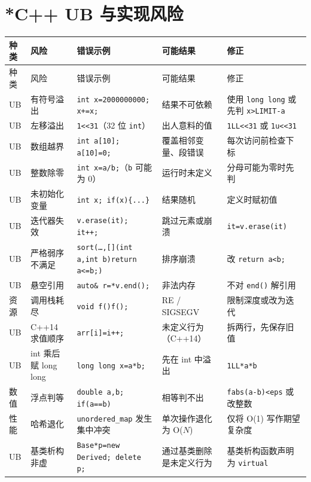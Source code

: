 \documentclass[a4paper,11pt]{article}
\newcommand{\code}[1]{\texttt{#1}}
\begin{document}
\newpage
\section{*C++ UB 与实现风险}

\begingroup
\small
\begin{longtable}{L{0.9cm} L{2cm} L{4.8cm} L{3.1cm} L{4.5cm}}
\toprule
种类 & 风险 & 错误示例 & 可能结果 & 修正 \\
\midrule
\endfirsthead
\toprule
种类 & 风险 & 错误示例 & 可能结果 & 修正 \\
\midrule
\endhead
\endfoot
\bottomrule
\endlastfoot

UB & 有符号溢出 & \code{int x=2000000000; x+=x;} & 结果不可依赖 & 使用 \code{long long} 或先判 \code{x>LIMIT-a} \\[2mm]
UB & 左移溢出 & \code{1<<31}（32 位 \code{int}） & 出人意料的值 & \code{1LL<<31} 或 \code{1u<<31} \\[2mm]
UB & 数组越界 & \code{int a[10]; a[10]=0;} & 覆盖相邻变量、段错误 & 每次访问前检查下标 \\[2mm]
UB & 整数除零 & \code{int x=a/b;}（\code{b} 可能为 $0$） & 运行时未定义 & 分母可能为零时先判 \\[2mm]
UB & 未初始化变量 & \code{int x; if(x)\{...\}} & 结果随机 & 定义时赋初值 \\[2mm]
UB & 迭代器失效 & \code{v.erase(it); it++;} & 跳过元素或崩溃 & \code{it=v.erase(it)} \\[2mm]
UB & 严格弱序不满足 & \code{sort(\dots,[](int a,int b){return a<=b;})} & 排序崩溃 & 改 \code{return a<b;} \\[2mm]
UB & 悬空引用 & \code{auto\& r=*v.end();} & 非法内存 & 不对 \code{end()} 解引用 \\[2mm]
资源 & 调用栈耗尽 & \code{void f(){f();}} & RE / SIGSEGV & 限制深度或改为迭代 \\[2mm]
UB & C++14 求值顺序 & \code{arr[i]=i++;} & 未定义行为（C++14） & 拆两行，先保存旧值 \\[2mm]
UB & int 乘后赋 long long & \code{long long x=a*b;} & 先在 int 中溢出 & \code{1LL*a*b} \\[2mm]
数值 & 浮点判等 & \code{double a,b; if(a==b)} & 相等判不出 & \code{fabs(a-b)<eps} 或改整数 \\[2mm]
性能 & 哈希退化 & \code{unordered\_map} 发生集中冲突 & 单次操作退化为 O($N$) & 仅将 O(1) 写作期望复杂度 \\[2mm]
UB & 基类析构非虚 & \code{Base*p=new Derived; delete p;} & 通过基类删除是未定义行为 & 基类析构函数声明为 \code{virtual} \\
\end{longtable}
\endgroup
\end{document}
